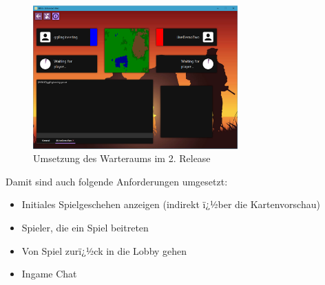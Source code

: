 \documentclass[12pt, titlepage]{scrartcl}
\begin{document}
			\begin{figure}[H] 
				\centering
				\includegraphics[width=0.7\textwidth]{WaitingRoom_final.PNG}
				\caption{Umsetzung des Warteraums im 2. Release}
				\label{ImplementationWaitingRoom}
			\end{figure}
			Damit sind auch folgende Anforderungen umgesetzt:
			\begin{itemize}
				\item Initiales Spielgeschehen anzeigen (indirekt ï¿½ber die Kartenvorschau)
				\item Spieler, die ein Spiel beitreten
				\item Von Spiel zurï¿½ck in die Lobby gehen
				\item Ingame Chat
			\end{itemize}
			
\end{document}
